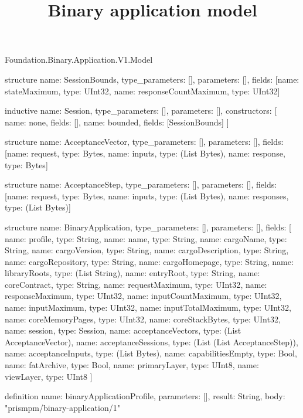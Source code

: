 \begin{lexlean}{Foundation.Binary.Application.V1.Model}
\title{Binary application model}
\begin{semanticmodule}
structure{
  name: SessionBounds,
  type_parameters: [],
  parameters: [],
  fields: [{name: stateMaximum, type: UInt32}, {name: responseCountMaximum, type: UInt32}]
}

inductive{
  name: Session,
  type_parameters: [],
  parameters: [],
  constructors: [
    {name: none, fields: []},
    {name: bounded, fields: [SessionBounds]}
  ]
}

structure{
  name: AcceptanceVector,
  type_parameters: [],
  parameters: [],
  fields: [{name: request, type: Bytes}, {name: inputs, type: (List Bytes)}, {name: response, type: Bytes}]
}

structure{
  name: AcceptanceStep,
  type_parameters: [],
  parameters: [],
  fields: [{name: request, type: Bytes}, {name: inputs, type: (List Bytes)}, {name: responses, type: (List Bytes)}]
}

structure{
  name: BinaryApplication,
  type_parameters: [],
  parameters: [],
  fields: [
    {name: profile, type: String},
    {name: name, type: String},
    {name: cargoName, type: String},
    {name: cargoVersion, type: String},
    {name: cargoDescription, type: String},
    {name: cargoRepository, type: String},
    {name: cargoHomepage, type: String},
    {name: libraryRoots, type: (List String)},
    {name: entryRoot, type: String},
    {name: coreContract, type: String},
    {name: requestMaximum, type: UInt32},
    {name: responseMaximum, type: UInt32},
    {name: inputCountMaximum, type: UInt32},
    {name: inputMaximum, type: UInt32},
    {name: inputTotalMaximum, type: UInt32},
    {name: coreMemoryPages, type: UInt32},
    {name: coreStackBytes, type: UInt32},
    {name: session, type: Session},
    {name: acceptanceVectors, type: (List AcceptanceVector)},
    {name: acceptanceSessions, type: (List (List AcceptanceStep))},
    {name: acceptanceInputs, type: (List Bytes)},
    {name: capabilitiesEmpty, type: Bool},
    {name: fatArchive, type: Bool},
    {name: primaryLayer, type: UInt8},
    {name: viewLayer, type: UInt8}
  ]
}

definition{
  name: binaryApplicationProfile,
  parameters: [],
  result: String,
  body: "prismpm/binary-application/1"
}
\end{semanticmodule}
\end{lexlean}
